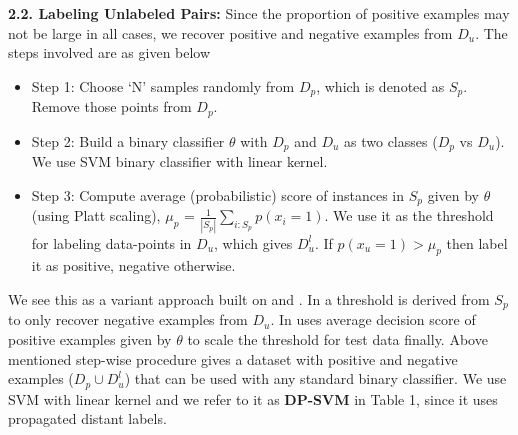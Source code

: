 \documentclass{sig-alternate-05-2015}
\begin{document}

\textbf{2.2. Labeling Unlabeled Pairs:} Since the proportion of positive examples may not be large in all cases, we recover positive and negative examples from $D_{u}$.   The steps involved are as given below

\begin{small}
\begin{itemize}

\item Step 1: Choose `N' samples randomly from $D_{p}$, which is denoted as $S_{p}$. Remove those points from $D_{p}$.
\item Step 2: Build a binary classifier $\theta$ with $D_{p}$ and $D_{u}$ as two classes ($D_{p}$ vs $D_{u}$).  We use SVM binary classifier with linear kernel.
\item Step 3: Compute average (probabilistic) score of instances in $S_{p}$ given by $\theta$ (using Platt scaling), $\mu_{p}$ = $\frac{1}{|S_{p}|}\sum_{i:S_{p}} p(x_{i}=1)$. We use it as the threshold for labeling data-points in $D_{u}$, which gives $D^{l}_{u}$.  If $p(x_{u}=1) > \mu_{p}$ then label it as positive, negative otherwise.

\end{itemize}
\end{small}

We see this as a variant approach built on \cite{Elkan:2008:LCO:1401890.1401920} and \cite{liu2002partially}. In \cite{liu2002partially} a threshold is derived from $S_{p}$ to only recover negative examples from $D_{u}$. In \cite{Elkan:2008:LCO:1401890.1401920} uses average decision score of positive examples given by $\theta$ to scale the threshold for test data finally. Above mentioned step-wise procedure gives a dataset with positive and negative examples ($D_{p} \cup D^l_{u}$) that can be used with any standard binary classifier. We use SVM with linear kernel and we refer to it as \textbf{DP-SVM} in Table 1, since it uses propagated distant labels.
\end{document}
